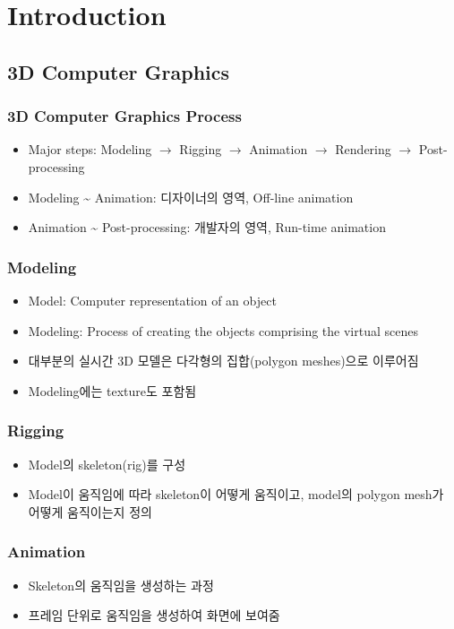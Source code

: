 \section{Introduction}

\subsection{3D Computer Graphics}

\subsubsection*{3D Computer Graphics Process}
\begin{itemize}
    \item Major steps: Modeling $\rightarrow$ Rigging $\rightarrow$ Animation $\rightarrow$ Rendering $\rightarrow$ Post-processing
    \item Modeling {\textasciitilde} Animation: 디자이너의 영역, Off-line animation
    \item Animation {\textasciitilde} Post-processing: 개발자의 영역, Run-time animation
\end{itemize}

\subsubsection*{Modeling}
\begin{itemize}
    \item Model: Computer representation of an object
    \item Modeling: Process of creating the objects comprising the virtual scenes
    \item 대부분의 실시간 3D 모델은 다각형의 집합(polygon meshes)으로 이루어짐
    \item Modeling에는 texture도 포함됨
\end{itemize}

\subsubsection*{Rigging}
\begin{itemize}
    \item Model의 skeleton(rig)를 구성
    \item Model이 움직임에 따라 skeleton이 어떻게 움직이고, model의 polygon mesh가 어떻게 움직이는지 정의
\end{itemize}

\subsubsection*{Animation}
\begin{itemize}
    \item Skeleton의 움직임을 생성하는 과정
    \item 프레임 단위로 움직임을 생성하여 화면에 보여줌
\end{itemize}

